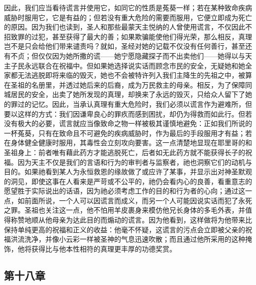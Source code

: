 因此，我们应当看待谎言并使用它，如同它的性质是菟葵一样；若在某种致命疾病威胁时服用它，它是有益的；但若没有重大危险的需要而服用，它便立即成为死亡的原因。因为我们也读到，圣人和那些最蒙天主悦纳的人曾使用谎言，不仅因此不招致罪的过犯，甚至获得了最大的善；如果欺骗能使他们得光荣，那么相反，真理岂不是只会给他们带来谴责吗？就如，圣经对她的记载不仅没有任何善行，甚至还有不贞；但仅仅因为她所撒的谎——她宁愿隐藏探子而不出卖他们——她得以与天主子民永远联合在祝福中。但如果她选择说实话而顾念市民的安全，无疑她和她全家都无法逃脱即将来临的毁灭，她也不会被特许列入我们主降生的先祖之中，被算在圣祖的名册里，并透过她后来的后裔，成为万民救主的母亲。相反，为了保障同城居民的安全，出卖了她所发现的真理，却换来了永远的毁灭，只给众人留下了她的罪过的记忆。因此，当承认真理有重大危险时，我们必须以谎言作为避难所，但要以这样的方式：我们因谦卑良心的罪疚而感到困扰，却仍为得救而如此行。但若没有极大的必要，谎言就应当像致命之物一样被极其谨慎地避免：正如我们所说的一杯菟葵，只有在致命且不可避免的疾病威胁时，作为最后的手段服用才有益；若在身体健全健康时服用，其毒性会立刻攻向要害。这一点清楚地显现在耶里哥的和圣祖身上：前者唯有藉此药方才能逃脱死亡，后者如无此药方就不能获得长子的祝福。因为天主不仅是我们的言语和行为的审判者与监察者，祂也洞察它们的动机与目的。如果祂看到某人为永恒救恩的缘故做了或应许了某事，并显示出对神圣默观的洞见，即使这事在人看来是严苛或不公平的，祂仍会看内心的良善，看重意志的愿望胜于实际说出的话语，因为祂必须考虑工作的目的和行为者的心向；通过这一点，如前面所说，一个人可以因谎言而成义，而另一个人可能因说实话而犯了永死之罪。圣祖也关注这一点，他不怕用羊皮裹身来模仿他兄长身体的多毛外表，并值得称赞地顺从他母亲为达此目的而煽动的谎言。因为他看到，这样做将为他带来比保持单纯更高的祝福和正义的收益：他毫不怀疑，这谎言的污点会立即被父亲的祝福洪流洗净，并像小云彩一样被圣神的气息迅速吹散；而且通过他所采用的这种掩饰，他将获得比与他本性相符的真理更丰厚的功德奖赏。\par


\subsection{第十八章}

\par

